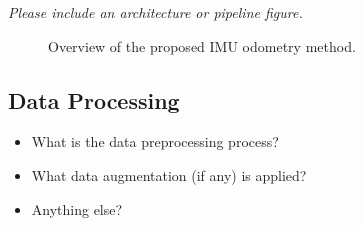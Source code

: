 \documentclass[letterpaper,10pt,conference]{ieeeconf}
\newcommand{\instruction}[1]{\textcolor{instructionblue}{\textit{#1}}}
\begin{document}
\instruction{
Please include an architecture or pipeline figure.
}

\begin{figure}[htbp]
    \centering
    \caption{Overview of the proposed IMU odometry method.}
    \label{fig:method_overview}
\end{figure}

\subsection{Data Processing}

\begin{itemize}
    \item What is the data preprocessing process?
        
    \item What data augmentation (if any) is applied?
    \item Anything else? 
\end{itemize}
\end{document}
